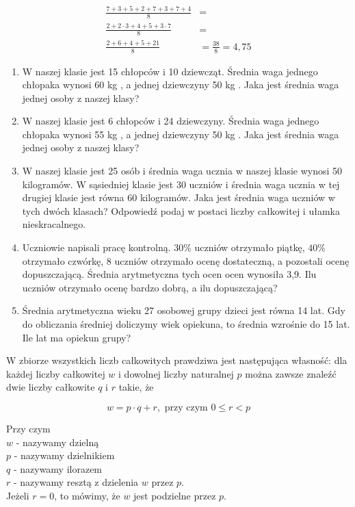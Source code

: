 \documentclass[10pt]{article}
\begin{document}
\[
\begin{aligned}
\frac{7+3+5+2+7+3+7+4}{8} & = \\
\frac{2+2 \cdot 3+4+5+3 \cdot 7}{8} & = \\
\frac{2+6+4+5+21}{8} & =\frac{38}{8}=4,75
\end{aligned}
\]

\begin{enumerate}
  \item W naszej klasie jest 15 chłopców i 10 dziewcząt. Średnia waga jednego chłopaka wynosi 60 kg , a jednej dziewczyny 50 kg . Jaka jest średnia waga jednej osoby z naszej klasy?
  \item W naszej klasie jest 6 chłopców i 24 dziewczyny. Średnia waga jednego chłopaka wynosi 55 kg , a jednej dziewczyny 50 kg . Jaka jest średnia waga jednej osoby z naszej klasy?
  \item W naszej klasie jest 25 osób i średnia waga ucznia w naszej klasie wynosi 50 kilogramów. W sąsiedniej klasie jest 30 uczniów i średnia waga ucznia w tej drugiej klasie jest równa 60 kilogramów. Jaka jest średnia waga uczniów w tych dwóch klasach? Odpowiedź podaj w postaci liczby całkowitej i ułamka nieskracalnego.
  \item Uczniowie napisali pracę kontrolną. \(30 \%\) uczniów otrzymało piątkę, \(40 \%\) otrzymało czwórkę, 8 uczniów otrzymało ocenę dostateczną, a pozostali ocenę dopuszczającą. Średnia arytmetyczna tych ocen ocen wynosiła 3,9. Ilu uczniów otrzymało ocenę bardzo dobrą, a ilu dopuszczającą?
  \item Średnia arytmetyczna wieku 27 osobowej grupy dzieci jest równa 14 lat. Gdy do obliczania średniej doliczymy wiek opiekuna, to średnia wzrośnie do 15 lat. Ile lat ma opiekun grupy?
\end{enumerate}

W zbiorze wszystkich liczb całkowitych prawdziwa jest następująca własność: dla każdej liczby całkowitej \(w\) i dowolnej liczby naturalnej \(p\) można zawsze znaleźć dwie liczby całkowite \(q\) i \(r\) takie, że

\[
w=p \cdot q+r, \text { przy czym } 0 \leqslant r<p
\]

Przy czym\\
\(w\) - nazywamy dzielną\\
\(p\) - nazywamy dzielnikiem\\
\(q\) - nazywamy ilorazem\\
\(r\) - nazywamy resztą z dzielenia \(w\) przez \(p\).\\
Jeżeli \(r=0\), to mówimy, że \(w\) jest podzielne przez \(p\).
\end{document}
